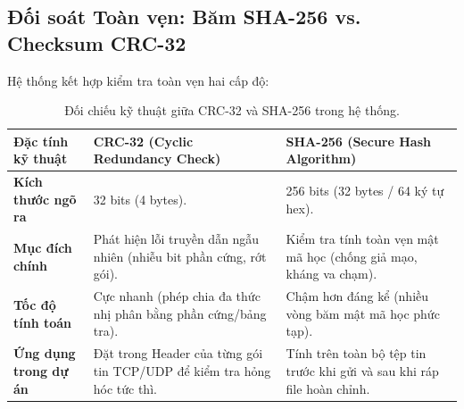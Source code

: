 \documentclass[11pt,a4paper]{article}
\begin{document}
\subsection{Đối soát Toàn vẹn: Băm SHA-256 vs. Checksum CRC-32}
Hệ thống kết hợp kiểm tra toàn vẹn hai cấp độ:
\begin{table}[htbp]
\centering
\small
\begin{tabularx}{\textwidth}{p{3.5cm}Xp{5.5cm}}
\toprule
\rowcolor{headergray}
\textbf{Đặc tính kỹ thuật} & \textbf{CRC-32 (Cyclic Redundancy Check)} & \textbf{SHA-256 (Secure Hash Algorithm)} \\
\midrule
\textbf{Kích thước ngõ ra} & 32 bits (4 bytes). & 256 bits (32 bytes / 64 ký tự hex). \\
\textbf{Mục đích chính} & Phát hiện lỗi truyền dẫn ngẫu nhiên (nhiễu bit phần cứng, rớt gói). & Kiểm tra tính toàn vẹn mật mã học (chống giả mạo, kháng va chạm). \\
\textbf{Tốc độ tính toán} & Cực nhanh (phép chia đa thức nhị phân bằng phần cứng/bảng tra). & Chậm hơn đáng kể (nhiều vòng băm mật mã học phức tạp). \\
\textbf{Ứng dụng trong dự án} & Đặt trong Header của từng gói tin TCP/UDP để kiểm tra hỏng hóc tức thì. & Tính trên toàn bộ tệp tin trước khi gửi và sau khi ráp file hoàn chỉnh. \\
\bottomrule
\end{tabularx}
\caption{Đối chiếu kỹ thuật giữa CRC-32 và SHA-256 trong hệ thống.}
\label{tab:crc_vs_sha}
\end{table}
\end{document}
